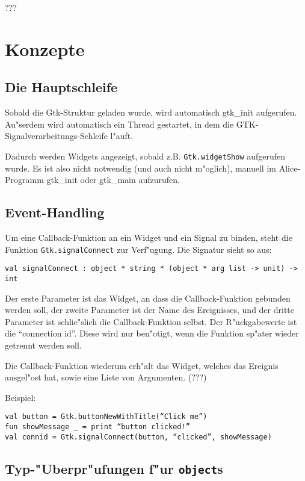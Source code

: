 \documentclass{article}
\begin{document}
???



\section{Konzepte}

\subsection{Die Hauptschleife}

Sobald die Gtk-Struktur geladen wurde, wird automatisch gtk\_init aufgerufen.
Au"serdem wird automatisch ein Thread gestartet, in dem die GTK-
Signalverarbeitungs-Schleife l"auft.

Dadurch werden Widgets angezeigt, sobald z.B. \texttt{Gtk.widgetShow}
aufgerufen wurde. Es ist also nicht notwendig (und auch nicht m"oglich), 
manuell im Alice-Programm gtk\_init oder gtk\_main aufzurufen.

\subsection{Event-Handling}

Um eine Callback-Funktion an ein Widget und ein Signal zu binden, steht die
Funktion \texttt{Gtk.signalConnect} zur Verf"ugung. Die Signatur sieht so aus:

\texttt
{val signalConnect : object * string * (object * arg list -> unit) -> int}

Der erste Parameter ist das Widget, an dass die Callback-Funktion gebunden
werden soll, der zweite Parameter ist der Name des Ereignisses, und der
dritte Parameter ist schlie"slich die Callback-Funktion selbst.
Der R"uckgabewerte ist die ``connection id''. Diese wird nur ben"otigt, wenn
die Funktion sp"ater wieder getrennt werden soll.

Die Callback-Funktion wiederum erh"alt das Widget, welches das Ereignis
ausgel"ost hat, sowie eine Liste von Argumenten. (???) 

Beispiel:

\texttt{val button = Gtk.buttonNewWithTitle(``Click me'')\\
        fun showMessage \_ = print ``button clicked!''\\
        val connid = Gtk.signalConnect(button, ``clicked'', showMessage)}


\subsection{Typ-"Uberpr"ufungen f"ur \texttt{object}s}
\end{document}
